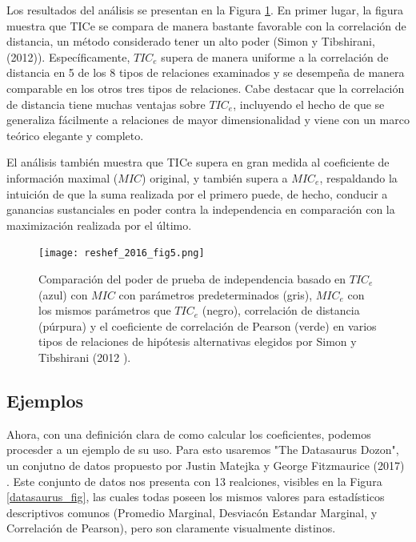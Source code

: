 	Los resultados del an\'alisis se presentan en la Figura \ref{reshef_2016_f5}. En primer lugar, la figura muestra que TICe se compara de manera bastante favorable con la correlaci\'on de distancia, un m\'etodo considerado tener un alto poder (Simon y Tibshirani, (2012)\cite{SimonTibshirani}). Espec\'ificamente, $TIC_e$ supera de manera uniforme a la correlaci\'on de distancia en 5 de los 8 tipos de relaciones examinados y se desempe\~na de manera comparable en los otros tres tipos de relaciones. Cabe destacar que la correlaci\'on de distancia tiene muchas ventajas sobre $TIC_e$, incluyendo el hecho de que se generaliza f\'acilmente a relaciones de mayor dimensionalidad y viene con un marco te\'orico elegante y completo.

	El an\'alisis tambi\'en muestra que TICe supera en gran medida al coeficiente de informaci\'on maximal ($MIC$) original, y tambi\'en supera a $MIC_e$, respaldando la intuici\'on de que la suma realizada por el primero puede, de hecho, conducir a ganancias sustanciales en poder contra la independencia en comparaci\'on con la maximizaci\'on realizada por el \'ultimo. 


	\begin{figure}[H] 
		\centering
		\texttt{[image: reshef\_2016\_fig5.png]}
		\caption{Comparaci\'on del poder de prueba de independencia basado en $TIC_e$ (azul) con $MIC$ con par\'ametros predeterminados (gris), $MIC_e$ con los mismos par\'ametros que $TIC_e$ (negro), correlaci\'on de distancia (p\'urpura) y el coeficiente de correlaci\'on de Pearson (verde) en varios tipos de relaciones de hip\'otesis alternativas elegidos por Simon y Tibshirani (2012 \cite{SimonTibshirani}).}
		\label{reshef_2016_f5}
	\end{figure}



	\newpage


	\subsection{Ejemplos}
	Ahora, con una definici\'on clara de como calcular los coeficientes, podemos procesder a un ejemplo de su uso. Para esto usaremos "The Datasaurus Dozon", un conjutno de datos propuesto por Justin Matejka y George Fitzmaurice (2017) \cite{datasaurus}. Este conjunto de datos nos presenta con 13 realciones, visibles en la Figura \ref{datasaurus_fig}, las cuales todas poseen los mismos valores para estad\'isticos descriptivos comunos (Promedio Marginal, Desviac\'on Estandar Marginal, y Correlaci\'on de Pearson), pero son claramente visualmente distinos.

